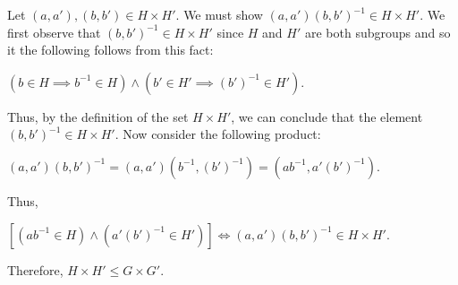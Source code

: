 \documentclass[12pt, a4paper]{article}
\begin{document}
\vspace{6mm}

    Let $(a,a'),(b,b')\in H\times H'$. We must show $(a,a')(b,b')^{-1}\in H\times H'$. We first observe that $(b, b')^{-1}\in H\times H'$ since $H$ and $H'$ are both subgroups and so it the following follows from this fact:\par
    
\newpage

        \centerline{$(b\in H\implies b^{-1}\in H)\wedge(b'\in H'\implies(b')^{-1}\in H')$.}
        
\vspace{6mm}

    Thus, by the definition of the set $H\times H'$, we can conclude that the element $(b, b')^{-1}\in H\times H'$. Now consider the following product:\par
    
\vspace{6mm}

        \centerline{$(a,a')(b,b')^{-1}=(a,a')(b^{-1},(b')^{-1})=(ab^{-1}, a'(b')^{-1})$.}
        
\vspace{2mm}

    Thus,
    
\vspace{2mm}

        \centerline{$[(ab^{-1}\in H)\wedge(a'(b')^{-1}\in H')]\Leftrightarrow (a,a')(b,b')^{-1}\in H\times H'$.}\par
        
\vspace{6mm}

    Therefore, $H\times H'\leqslant G\times G'$.

    


    
\end{document}
